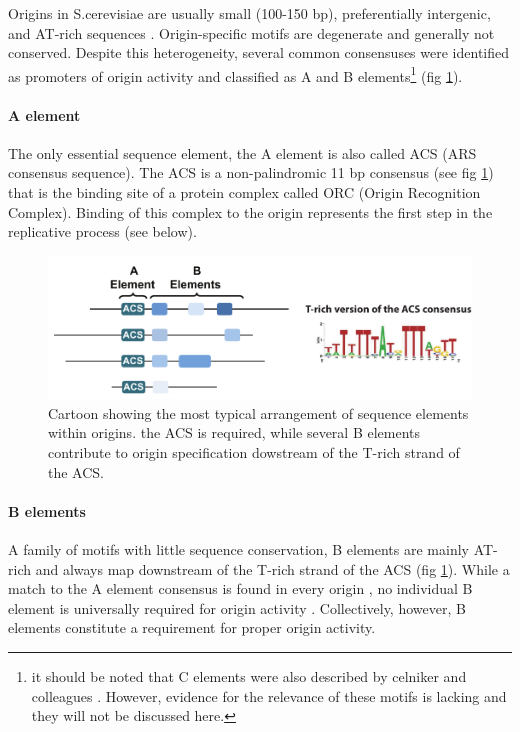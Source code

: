 Origins in S.cerevisiae are usually small (100-150 bp), preferentially intergenic, and AT-rich sequences \cite{raghuraman:2016:sequence}. 
Origin-specific motifs are degenerate and generally not conserved. Despite this heterogeneity, several common consensuses were identified as promoters of origin activity and classified as A and B elements\footnote{it should be noted that C elements were also described by celniker and colleagues \cite{celniker:1984:deletion}. However, evidence for the relevance of these motifs \invivo{} is lacking and they will not be discussed here.} (fig \ref{fig:originSchemaIntro}).


\paragraph{A element}
The only essential sequence element, the A element is also called ACS (ARS consensus sequence). 
The ACS is a non-palindromic 11 bp consensus (see fig \ref{fig:originSchemaIntro})\cite{celniker:1984:deletion,nieduszynski:2006:genomewide} that is the binding site of a protein complex called ORC (Origin Recognition Complex). 
Binding of this complex to the origin represents the first step in the replicative process (see below)\cite{diffley:1992:proteindna}.

\begin{figure}[ht]

\centering
\includegraphics[width=\textwidth]{figures/results/acs}
\caption[ACS consensus and arrangement relative to other origin DNA elements]{Cartoon showing the most typical arrangement of sequence elements within origins. the ACS is required, while several B elements contribute to origin specification dowstream of the T-rich strand of the ACS.}
\label{fig:originSchemaIntro}

\end{figure}

\paragraph{B elements}
A family of motifs with little sequence conservation, B elements are mainly AT-rich and always map downstream of the T-rich strand of the ACS (fig \ref{fig:originSchemaIntro})\cite{raghuraman:2016:sequence}. 
While a match to the A element consensus is found in every origin \cite{celniker:1984:deletion}, no individual B element is universally required for origin activity \cite{marahrens:1992:yeast,lucas:2003:dynamics}. Collectively, however, B elements constitute a requirement for proper origin activity.

